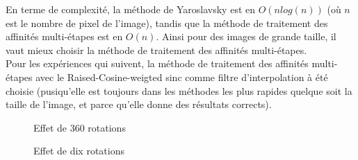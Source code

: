 En terme de complexité, la méthode de Yaroslavsky est en $O(n log(n))$ (où $n$ est le nombre de pixel de l'image), tandis que la méthode de traitement des affinités multi-étapes est en $O(n)$. Ainsi pour des images de grande taille, il vaut mieux choisir la méthode de traitement des affinités multi-étapes.\\

Pour les expériences qui suivent, la méthode de traitement des affinités multi-étapes avec le  Raised-Cosine-weigted sinc comme filtre d'interpolation à été choisie (pusiqu'elle est toujours dans les méthodes les plus rapides quelque soit la taille de l'image, et parce qu'elle donne des résultats corrects).  

 \begin{figure}[h]
 
   \centering
   \caption{Effet de 360 rotations}
\label{rotalenabis}
 \end{figure}

 \begin{figure}[h]
 
   \centering
   \caption{Effet de dix rotations}
\label{rotalena}
 \end{figure}